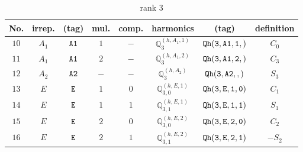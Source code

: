 \documentclass[fleqn,8pt]{jsarticle}
\begin{document}
\begin{table}[ht!]
\begin{center}
\caption{rank 3}
\renewcommand{\arraystretch}{1.3}
\begin{tabular}{cccccccc} \hline \hline
No. & irrep. & (tag) & mul. & comp. & harmonics & (tag) & definition \\ \hline
$ 10 $ & $ A_{1} $ & $ {\tt A1} $ & $ 1 $ & $ - $ & $ \mathbb{Q}_{3}^{(h,A_{1},1)} $ & $ {\tt Qh(3,A1,1,)} $ & $ C_{0} $ \\
$ 11 $ & $ A_{1} $ & $ {\tt A1} $ & $ 2 $ & $ - $ & $ \mathbb{Q}_{3}^{(h,A_{1},2)} $ & $ {\tt Qh(3,A1,2,)} $ & $ C_{3} $ \\
$ 12 $ & $ A_{2} $ & $ {\tt A2} $ & $ - $ & $ - $ & $ \mathbb{Q}_{3}^{(h,A_{2})} $ & $ {\tt Qh(3,A2,,)} $ & $ S_{3} $ \\
$ 13 $ & $ E $ & $ {\tt E} $ & $ 1 $ & $ 0 $ & $ \mathbb{Q}_{3,0}^{(h,E,1)} $ & $ {\tt Qh(3,E,1,0)} $ & $ C_{1} $ \\
$ 14 $ & $ E $ & $ {\tt E} $ & $ 1 $ & $ 1 $ & $ \mathbb{Q}_{3,1}^{(h,E,1)} $ & $ {\tt Qh(3,E,1,1)} $ & $ S_{1} $ \\
$ 15 $ & $ E $ & $ {\tt E} $ & $ 2 $ & $ 0 $ & $ \mathbb{Q}_{3,0}^{(h,E,2)} $ & $ {\tt Qh(3,E,2,0)} $ & $ C_{2} $ \\
$ 16 $ & $ E $ & $ {\tt E} $ & $ 2 $ & $ 1 $ & $ \mathbb{Q}_{3,1}^{(h,E,2)} $ & $ {\tt Qh(3,E,2,1)} $ & $ - S_{2} $ \\
 \hline \hline
\end{tabular}
\end{center}
\end{table}
\end{document}
